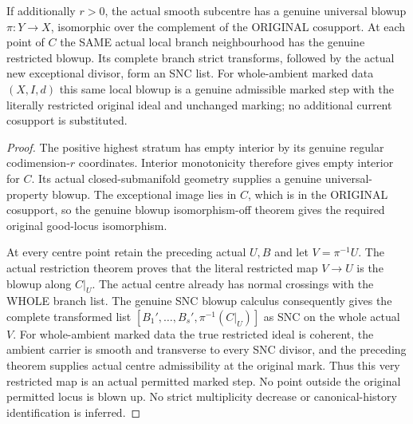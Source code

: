 \begin{theorem}
\label{hir:nc-highest-subcentre-actual-blowup}
If additionally $r>0$, the actual smooth subcentre has a genuine universal
blowup $\pi:Y\to X$, isomorphic over the complement of the ORIGINAL
cosupport. At each point of $C$ the SAME actual local branch neighbourhood
has the genuine restricted blowup. Its complete branch strict transforms,
followed by the actual new exceptional divisor, form an SNC list.
For whole-ambient marked data $(X,I,d)$ this same local blowup is a genuine
admissible marked step with the literally restricted original ideal and
unchanged marking; no additional current cosupport is substituted.
\leanok
\end{theorem}
\begin{proof}
The positive highest stratum has empty interior by its genuine regular
codimension-$r$ coordinates. Interior monotonicity therefore gives empty
interior for $C$. Its actual closed-submanifold geometry supplies a genuine
universal-property blowup. The exceptional image lies in $C$, which is in
the ORIGINAL cosupport, so the genuine blowup isomorphism-off theorem gives
the required original good-locus isomorphism.

At every centre point retain the preceding actual $U,B$ and let
$V=\pi^{-1}U$. The actual restriction theorem proves that the literal
restricted map $V\to U$ is the blowup along $C|_U$. The actual centre already
has normal crossings with the WHOLE branch list. The genuine SNC blowup
calculus consequently gives the complete transformed list
$[B_1',\ldots,B_s',\pi^{-1}(C|_U)]$ as SNC on the whole actual $V$.
For whole-ambient marked data the true restricted ideal is coherent,
the ambient carrier is smooth and transverse to every SNC divisor, and
the preceding theorem supplies actual centre admissibility at the original
mark. Thus this very restricted map is an actual permitted marked step.
No point outside the original permitted locus is blown up. No strict
multiplicity decrease or canonical-history identification is inferred.
\end{proof}
